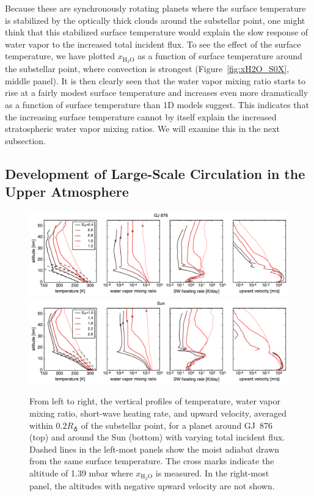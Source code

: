 \documentclass[11pt,numberedappendix,twocolappendix,]{emulateapj}
\def\water{H$_2$O}
\def\xwater{$x_\text{\water}$}
\def\preslevel{1.39 mbar}
\def\wv{water vapor}
\begin{document}
Because these are synchronously rotating planets where the surface temperature is stabilized by the optically thick clouds around the substellar point, one might think that this stabilized surface temperature would explain the slow  response of \wv{} to the increased total incident flux. 
To see the effect of the surface temperature, we have plotted \xwater{} as a function of surface temperature around the substellar point, where convection is strongest (Figure~\ref{fig:xH2O_S0X}, middle panel). 
It is then clearly seen that the \wv{}  mixing ratio starts to rise at a fairly modest surface temperature and increases even more dramatically as a function of surface temperature than 1D models suggest. 
This indicates that the increasing surface temperature cannot by itself explain the increased stratospheric \wv{} mixing ratios. 
We will examine this in the next subsection. 

\subsection{Development of Large-Scale Circulation in the Upper Atmosphere}
\label{ss:result_omega}

\begin{figure}[htb]
    \begin{center}
    \includegraphics[width=1\hsize]{AqOH0TLS_GJ876_temp_xH2O_vz_heat.pdf}
    \includegraphics[width=1\hsize]{AqOH0TLS_Sun_temp_xH2O_vz_heat.pdf}
    \end{center}
\caption{From left to right, the vertical profiles of temperature, \wv{} mixing ratio, short-wave heating rate, and upward velocity, averaged within $0.2R_\earth$ of the substellar point, for a planet around GJ~876 (top) and around the Sun (bottom) with varying total incident flux. Dashed lines in the left-most panels show the moist adiabat drawn from the same surface temperature. The cross marks indicate the altitude of \preslevel{} where \xwater{} is measured. In the right-most panel, the altitudes with negative upward velocity are not shown. }
\label{fig:AqOH0TLS_GJ876_temp_xH2O_vz_heat}
\end{figure}
\end{document}
